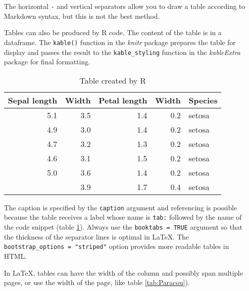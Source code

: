 \documentclass[fleqn,]{article} %
\begin{document}
The horizontal \texttt{-} and vertical separators \texttt{\textbar{}} allow you to draw a table according to Markdown syntax, but this is not the best method.

Tables can also be produced by R code.
The content of the table is in a dataframe.
The \texttt{kable()} function in the \emph{knitr} package prepares the table for display and passes the result to the \texttt{kable\_styling} function in the \emph{kableExtra} package for final formatting.

\scriptsize

\begin{longtable}[t]{rrrrl}
\caption{\label{tab:kable}Table created by R}\\
\toprule
Sepal length & Width & Petal length & Width & Species\\
\midrule
5.1 & 3.5 & 1.4 & 0.2 & setosa\\
4.9 & 3.0 & 1.4 & 0.2 & setosa\\
4.7 & 3.2 & 1.3 & 0.2 & setosa\\
4.6 & 3.1 & 1.5 & 0.2 & setosa\\
5.0 & 3.6 & 1.4 & 0.2 & setosa\\
\addlinespace
5.4 & 3.9 & 1.7 & 0.4 & setosa\\
\bottomrule
\end{longtable}

\normalsize

The caption is specified by the \texttt{caption} argument and referencing is possible because the table receives a label whose name is \texttt{tab:} followed by the name of the code snippet (table \ref{tab:kable}).
Always use the \texttt{booktabs\ =\ TRUE} argument so that the thickness of the separator lines is optimal in LaTeX.
The \texttt{bootstrap\_options\ =\ "striped"} option provides more readable tables in HTML.

In LaTeX, tables can have the width of the column and possibly span multiple pages, or use the width of the page, like table \ref{tab:Paracou}).



\scriptsize
\end{document}
